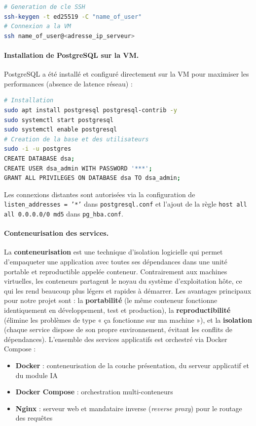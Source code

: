 \documentclass[10pt,twocolumn,a4paper]{article}
\begin{document}
\begin{lstlisting}[language=bash, caption={Configuration SSH et accès à la VM}]
# Generation de cle SSH
ssh-keygen -t ed25519 -C "name_of_user"
# Connexion a la VM
ssh name_of_user@<adresse_ip_serveur>
\end{lstlisting}

\paragraph{Installation de PostgreSQL sur la VM.} PostgreSQL a été installé et configuré directement sur la VM pour maximiser les performances (absence de latence réseau) :

\begin{lstlisting}[language=bash, caption={Installation et configuration PostgreSQL}]
# Installation
sudo apt install postgresql postgresql-contrib -y
sudo systemctl start postgresql
sudo systemctl enable postgresql
# Creation de la base et des utilisateurs
sudo -i -u postgres
CREATE DATABASE dsa;
CREATE USER dsa_admin WITH PASSWORD '***';
GRANT ALL PRIVILEGES ON DATABASE dsa TO dsa_admin;
\end{lstlisting}

Les connexions distantes sont autorisées via la configuration de \texttt{listen\_addresses = '*'} dans \texttt{postgresql.conf} et l'ajout de la règle \texttt{host all all 0.0.0.0/0 md5} dans \texttt{pg\_hba.conf}.

\paragraph{Conteneurisation des services.} La \textbf{conteneurisation} est une technique d'isolation logicielle qui permet d'empaqueter une application avec toutes ses dépendances dans une unité portable et reproductible appelée conteneur. Contrairement aux machines virtuelles, les conteneurs partagent le noyau du système d'exploitation hôte, ce qui les rend beaucoup plus légers et rapides à démarrer. Les avantages principaux pour notre projet sont : la \textbf{portabilité} (le même conteneur fonctionne identiquement en développement, test et production), la \textbf{reproductibilité} (élimine les problèmes de type « ça fonctionne sur ma machine »), et la \textbf{isolation} (chaque service dispose de son propre environnement, évitant les conflits de dépendances). L'ensemble des services applicatifs est orchestré via Docker Compose \cite{docker} :
\begin{itemize}
    \item \textbf{Docker} : conteneurisation de la couche présentation, du serveur applicatif et du module IA
    \item \textbf{Docker Compose} : orchestration multi-conteneurs
    \item \textbf{Nginx} : serveur web et mandataire inverse (\textit{reverse proxy}) pour le routage des requêtes
\end{itemize}
\end{document}
